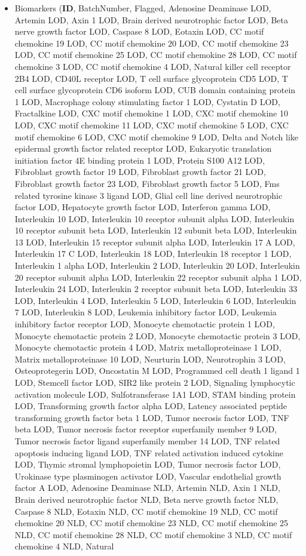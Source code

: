 \begin{sloppypar}
\begin{itemize}
    \item {Biomarkers} (\textbf{ID}, BatchNumber, Flagged, Adenosine Deaminase LOD, Artemin LOD, Axin 1 LOD, Brain derived neurotrophic factor LOD, Beta nerve growth factor LOD, Caspase 8 LOD, Eotaxin LOD, CC motif chemokine 19 LOD, CC motif chemokine 20 LOD, CC motif chemokine 23 LOD, CC motif chemokine 25 LOD, CC motif chemokine 28 LOD, CC motif chemokine 3 LOD, CC motif chemokine 4 LOD, Natural killer cell receptor 2B4 LOD, CD40L receptor LOD, T cell surface glycoprotein CD5 LOD, T cell surface glycoprotein CD6 isoform LOD, CUB domain containing protein 1 LOD, Macrophage colony stimulating factor 1 LOD, Cystatin D LOD, Fractalkine LOD, CXC motif chemokine 1 LOD, CXC motif chemokine 10 LOD, CXC motif chemokine 11 LOD, CXC motif chemokine 5 LOD, CXC motif chemokine 6 LOD, CXC motif chemokine 9 LOD, Delta and Notch like epidermal growth factor related receptor LOD, Eukaryotic translation initiation factor 4E binding protein 1 LOD, Protein S100 A12 LOD, Fibroblast growth factor 19 LOD, Fibroblast growth factor 21 LOD, Fibroblast growth factor 23 LOD, Fibroblast growth factor 5 LOD, Fms related tyrosine kinase 3 ligand LOD, Glial cell line derived neurotrophic factor LOD, Hepatocyte growth factor LOD, Interferon gamma LOD, Interleukin 10 LOD, Interleukin 10 receptor subunit alpha LOD, Interleukin 10 receptor subunit beta LOD, Interleukin 12 subunit beta LOD, Interleukin 13 LOD, Interleukin 15 receptor subunit alpha LOD, Interleukin 17 A LOD, Interleukin 17 C LOD, Interleukin 18 LOD, Interleukin 18 receptor 1 LOD, Interleukin 1 alpha LOD, Interleukin 2 LOD, Interleukin 20 LOD, Interleukin 20 receptor subunit alpha LOD, Interleukin 22 receptor subunit alpha 1 LOD, Interleukin 24 LOD, Interleukin 2 receptor subunit beta LOD, Interleukin 33 LOD, Interleukin 4 LOD, Interleukin 5 LOD, Interleukin 6 LOD, Interleukin 7 LOD, Interleukin 8 LOD, Leukemia inhibitory factor LOD, Leukemia inhibitory factor receptor LOD, Monocyte chemotactic protein 1 LOD, Monocyte chemotactic protein 2 LOD, Monocyte chemotactic protein 3 LOD, Monocyte chemotactic protein 4 LOD, Matrix metalloproteinase 1 LOD, Matrix metalloproteinase 10 LOD, Neurturin LOD, Neurotrophin 3 LOD, Osteoprotegerin LOD, Oncostatin M LOD, Programmed cell death 1 ligand 1 LOD, Stemcell factor LOD, SIR2 like protein 2 LOD, Signaling lymphocytic activation molecule LOD, Sulfotransferase 1A1 LOD, STAM binding protein LOD, Transforming growth factor alpha LOD, Latency associated peptide transforming growth factor beta 1 LOD, Tumor necrosis factor LOD, TNF beta LOD, Tumor necrosis factor receptor superfamily member 9 LOD, Tumor necrosis factor ligand superfamily member 14 LOD, TNF related apoptosis inducing ligand LOD, TNF related activation induced cytokine LOD, Thymic stromal lymphopoietin LOD, Tumor necrosis factor LOD, Urokinase type plasminogen activator LOD, Vascular endothelial growth factor A LOD, Adenosine Deaminase NLD, Artemin NLD, Axin 1 NLD, Brain derived neurotrophic factor NLD, Beta nerve growth factor NLD, Caspase 8 NLD, Eotaxin NLD, CC motif chemokine 19 NLD, CC motif chemokine 20 NLD, CC motif chemokine 23 NLD, CC motif chemokine 25 NLD, CC motif chemokine 28 NLD, CC motif chemokine 3 NLD, CC motif chemokine 4 NLD, Natural 
\end{itemize}
\end{sloppypar}
